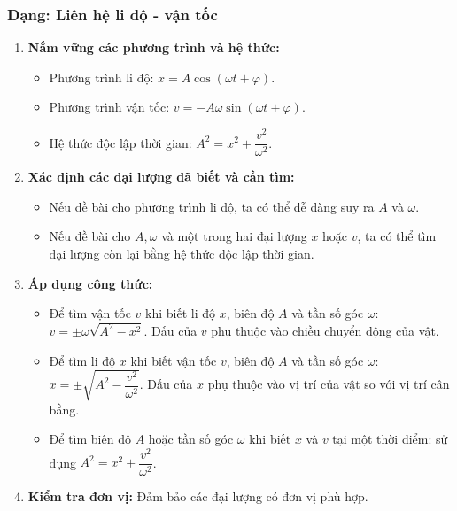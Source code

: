 \subsubsection{Dạng: Liên hệ li độ - vận tốc}
\begin{phuongphap}
\begin{enumerate}
    \item \textbf{Nắm vững các phương trình và hệ thức:}
    \begin{itemize}
        \item Phương trình li độ: $x = A\cos(\omega t + \varphi)$.
        \item Phương trình vận tốc: $v = -A\omega\sin(\omega t + \varphi)$.
        \item Hệ thức độc lập thời gian: $A^2 = x^2 + \dfrac{v^2}{\omega^2}$.
    \end{itemize}
    \item \textbf{Xác định các đại lượng đã biết và cần tìm:}
    \begin{itemize}
        \item Nếu đề bài cho phương trình li độ, ta có thể dễ dàng suy ra $A$ và $\omega$.
        \item Nếu đề bài cho $A, \omega$ và một trong hai đại lượng $x$ hoặc $v$, ta có thể tìm đại lượng còn lại bằng hệ thức độc lập thời gian.
    \end{itemize}
    \item \textbf{Áp dụng công thức:}
    \begin{itemize}
        \item Để tìm vận tốc $v$ khi biết li độ $x$, biên độ $A$ và tần số góc $\omega$: $v = \pm \omega\sqrt{A^2 - x^2}$. Dấu của $v$ phụ thuộc vào chiều chuyển động của vật.
        \item Để tìm li độ $x$ khi biết vận tốc $v$, biên độ $A$ và tần số góc $\omega$: $x = \pm \sqrt{A^2 - \dfrac{v^2}{\omega^2}}$. Dấu của $x$ phụ thuộc vào vị trí của vật so với vị trí cân bằng.
        \item Để tìm biên độ $A$ hoặc tần số góc $\omega$ khi biết $x$ và $v$ tại một thời điểm: sử dụng $A^2 = x^2 + \dfrac{v^2}{\omega^2}$.
    \end{itemize}
    \item \textbf{Kiểm tra đơn vị:} Đảm bảo các đại lượng có đơn vị phù hợp.
\end{enumerate}
\end{phuongphap}
